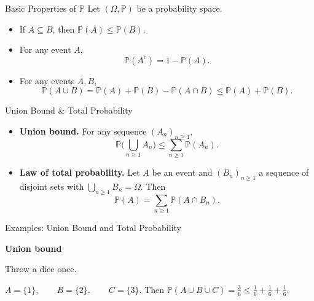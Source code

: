 \documentclass[aspectratio=169]{beamer}
\begin{document}
\begin{frame}{Basic Properties of \(\mathbb{P}\)}
Let \((\Omega,\mathbb{P})\) be a probability space.
\begin{itemize}
  \item If \(A \subseteq B\), then \(\mathbb{P}(A) \le \mathbb{P}(B)\).
  \pause 
  \item For any event \(A\),
    \[
      \mathbb{P}(A^c) = 1 - \mathbb{P}(A).
    \]\pause 
  \item For any events \(A,B\),
    \[
      \mathbb{P}(A \cup B) = \mathbb{P}(A) + \mathbb{P}(B) - \mathbb{P}(A\cap B)
      \le \mathbb{P}(A)+\mathbb{P}(B).
    \]\pause 
\end{itemize}
\medskip
\pause 
\vspace{-6mm}
\begin{center}
\end{center}
\end{frame}

\begin{frame}{Union Bound \& Total Probability}
\begin{itemize}
  \item \textbf{Union bound.} For any sequence \((A_n)_{n\ge1}\),
  \[
    \mathbb{P}\Big(\bigcup_{n\ge1} A_n\Big) \le \sum_{n\ge1} \mathbb{P}(A_n).
  \]
  \pause 
  \item \textbf{Law of total probability.} Let \(A\) be an event and \((B_n)_{n\ge1}\) a sequence of disjoint sets with \(\bigcup_{n\ge1} B_n = \Omega\). Then
  \[
    \mathbb{P}(A) = \sum_{n\ge1} \mathbb{P}(A \cap B_n).
  \]
  \pause 
\end{itemize}
\end{frame}

\begin{frame}{Examples: Union Bound and Total Probability}

\textbf{Union bound}

Throw a dice once.

$
A=\{1\},\qquad B=\{2\},\qquad C=\{3\}.
$
\pause 
Then
$
\mathbb{P}(A\cup B\cup C)=\frac{3}{6}
\le \frac{1}{6}+\frac{1}{6}+\frac{1}{6}.
$

\end{frame}
\end{document}
